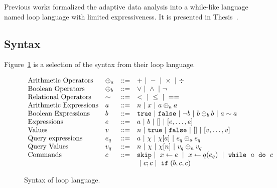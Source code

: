 Previous works formalized the adaptive data analysis into a while-like language named loop language with  limited expressiveness.
It is presented in {Thesis~\cite{weihao22}}.
\subsection*{Syntax}
Figure~\ref{fig:prework_syntax} is a selection of the syntax from their loop language.
{\small
\begin{figure}
\[
\begin{array}{llll}
 \mbox{Arithmetic Operators} & \oplus_a & ::= & + ~|~ - ~|~ \times 
%
~|~ \div \\  
  \mbox{Boolean Operators} & \oplus_b & ::= & \lor ~|~ \land ~|~ \neg\\
   \mbox{Relational Operators} & \sim & ::= & < ~|~ \leq ~|~ == \\  
\mbox{Arithmetic Expressions} & \aexpr & ::= & 
	n ~|~ x ~|~ \aexpr \oplus_a \aexpr  \\
\mbox{Boolean Expressions} & \bexpr & ::= & 
	\etrue ~|~ \efalse  ~|~ \neg \bexpr
	 ~|~ \bexpr \oplus_b \bexpr
	~|~ \aexpr \sim \aexpr \\
\mbox{Expressions} & \expr & ::= & \aexpr ~|~ \bexpr ~|~ [] ~|~ [\expr, \dots, \expr] \\	
\mbox{Values} & v & ::= & n ~|~ \etrue ~|~ \efalse ~|~ [] ~|~ [v, \dots, v] \\
\mbox{Query expressions} & \expr_q & ::= & \aexpr ~|~ \chi ~|~ \chi[\aexpr] ~|~ \expr_q \oplus_a \expr_q \\
\mbox{Query Values} & v_q & ::= & n ~|~ \chi ~|~ \chi[n] ~|~ v_q \oplus_a  v_q \\
\mbox{Commands} & c & ::= &  \eskip  ~|~  \assign x \expr ~|~  \assign{x}{ q(\expr_q)}
%
~|~ \eloop ~ \aexpr  ~ \edo ~ c  \\ &&& ~|~ c;c  ~|~ \eif(\bexpr, c, c)
\end{array}
\]
 \caption{Syntax of loop language.}
    \label{fig:prework_syntax}
\end{figure}
}
